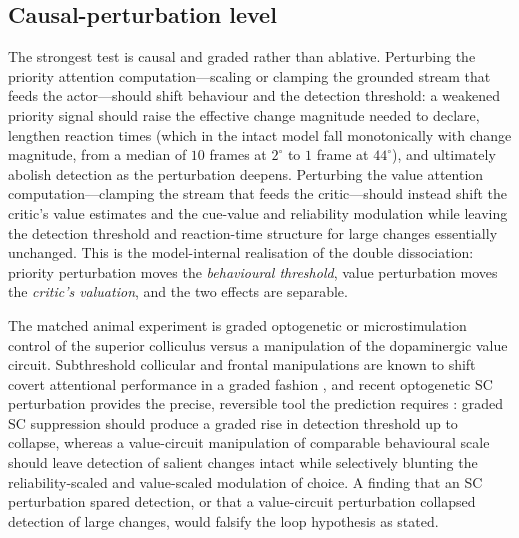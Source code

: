\subsection{Causal-perturbation level}

The strongest test is causal and graded rather than ablative. Perturbing the priority attention computation---scaling or clamping the grounded stream that feeds the actor---should shift behaviour and the detection threshold: a weakened priority signal should raise the effective change magnitude needed to declare, lengthen reaction times (which in the intact model fall monotonically with change magnitude, from a median of $10$ frames at $2^{\circ}$ to $1$ frame at $44^{\circ}$), and ultimately abolish detection as the perturbation deepens. Perturbing the value attention computation---clamping the stream that feeds the critic---should instead shift the critic's value estimates and the cue-value and reliability modulation while leaving the detection threshold and reaction-time structure for large changes essentially unchanged. This is the model-internal realisation of the double dissociation: priority perturbation moves the \emph{behavioural threshold}, value perturbation moves the \emph{critic's valuation}, and the two effects are separable.

The matched animal experiment is graded optogenetic or microstimulation control of the superior colliculus versus a manipulation of the dopaminergic value circuit. Subthreshold collicular and frontal manipulations are known to shift covert attentional performance in a graded fashion \citep{moore2001control,moore2004microstimulation,stine2023differential,herman2020attention}, and recent optogenetic SC perturbation provides the precise, reversible tool the prediction requires \citep{katz2025optogenetic,krauzlis2018selective}: graded SC suppression should produce a graded rise in detection threshold up to collapse, whereas a value-circuit manipulation of comparable behavioural scale should leave detection of salient changes intact while selectively blunting the reliability-scaled and value-scaled modulation of choice. A finding that an SC perturbation spared detection, or that a value-circuit perturbation collapsed detection of large changes, would falsify the loop hypothesis as stated.
